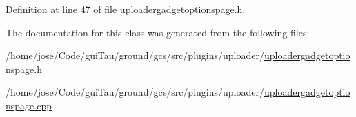 Definition at line 47 of file uploadergadgetoptionspage.\-h.



The documentation for this class was generated from the following files\-:\begin{DoxyCompactItemize}
\item 
/home/jose/\-Code/gui\-Tau/ground/gcs/src/plugins/uploader/\hyperlink{uploadergadgetoptionspage_8h}{uploadergadgetoptionspage.\-h}\item 
/home/jose/\-Code/gui\-Tau/ground/gcs/src/plugins/uploader/\hyperlink{uploadergadgetoptionspage_8cpp}{uploadergadgetoptionspage.\-cpp}\end{DoxyCompactItemize}
